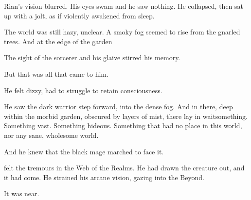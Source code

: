 \begin{garbage}
\begin{comment}
\subsubsection{Rian}
\end{comment}
\new
Rian's vision blurred. His eyes swam and he saw nothing. 
He collapsed, then sat up with a jolt, as if violently awakened from sleep. 


The world was still hazy, unclear. A smoky fog seemed to rise from the gnarled trees. And at the edge of the garden\prikker {}

The sight of the sorcerer and his glaive stirred his memory. 


But that was all that came to him. 

He felt dizzy, had to struggle to retain consciousness. 

He saw the dark warrior step forward, into the dense fog. 
And in there, deep within the morbid garden, obscured by layers of mist, there lay in wait\prikker something. Something vast. Something hideous. Something that had no place in this world, nor any sane, wholesome world. 

And he knew that the black mage marched to face it. 







\begin{comment}
\subsubsection{\Ishnaruchaefir}
\end{comment}
\new
\QuessanthIshnaruchaefir{} felt the tremours in the Web of the Realms. He had drawn the creature out, and it had come. He strained his arcane vision, gazing into the Beyond. 

It was near. 


\end{garbage}

